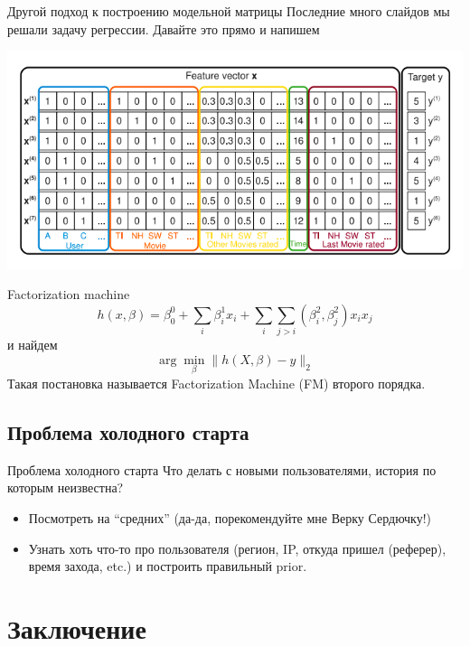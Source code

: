 \documentclass[14pt, fleqn, xcolor={dvipsnames, table}]{beamer}
\begin{document}
\begin{frame}{Другой подход к построению модельной матрицы}
Последние много слайдов мы решали задачу регрессии. Давайте это прямо и напишем
\begin{center}
\includegraphics[width=1\textwidth]{FMSetup.png}
\end{center}
\end{frame}

\begin{frame}{Factorization machine}
\small
$$
h(x, \beta) = \beta_0^0 + \sum_i \beta_i^1 x_i + \sum_i \sum_{j > i} (\beta_i^2, \beta_j^2)x_i x_j
$$
и найдем
$$
\arg \min_\beta \|h(X, \beta) - y\|_2
$$
Такая постановка называется Factorization Machine (FM) второго порядка.
\end{frame}

\subsection{Проблема холодного старта}
\begin{frame}{Проблема холодного старта}
Что делать с новыми пользователями, история по которым неизвестна?
\begin{itemize}
  \item Посмотреть на ``средних'' (да-да, порекомендуйте мне Верку Сердючку!)
  \item Узнать хоть что-то про пользователя (регион, IP, откуда пришел (реферер), время захода, etc.) и построить правильный prior.
\end{itemize}
\end{frame}

\section{Заключение}
\end{document}
